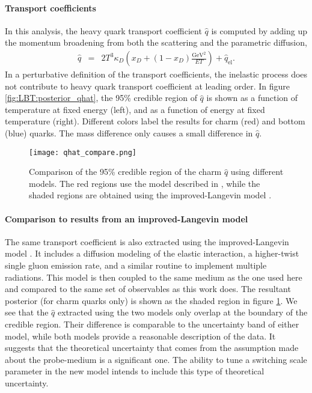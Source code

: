 \paragraph{Transport coefficients} In this analysis, the heavy quark transport coefficient $\hat{q}$ is computed by adding up the momentum broadening from both the scattering and the parametric diffusion,
\begin{eqnarray}\label{eq:qhat}
\hat{q} &=& 2T^3\kappa_D\left(x_D + (1-x_D)\frac{\textrm{GeV}^2}{ET}\right) + \hat{q}_{\textrm{el}}.
\end{eqnarray}
In a perturbative definition of the transport coefficients, the inelastic process does not contribute to heavy quark transport coefficient at leading order. 
In figure \ref{fig:LBT:posterior_qhat}, the 95\% credible region of $\hat{q}$ is shown as a function of temperature at fixed energy (left), and as a function of energy at fixed temperature (right).
Different colors label the results for charm (red) and bottom (blue) quarks.
The mass difference only causes a small difference in $\hat{q}$.

\begin{figure}
\singlespacing
\centering
\texttt{[image: qhat\_compare.png]}
\caption[Comparison of the 95\% credible region of the charm $\hat{q}$ using]{Comparison of the 95\% credible region of the charm $\hat{q}$ using different models. The red regions use the model described in \cite{Ke:2018tsh}, while the  shaded regions are obtained using  the improved-Langevin model \cite{Cao:2013ita}.}\label{fig:LBT:compare_qhat}
\end{figure}

\paragraph{Comparison to results from an improved-Langevin model}
The same transport coefficient is also extracted using the improved-Langevin model \cite{Cao:2013ita}.
It includes a diffusion modeling of the elastic interaction, a higher-twist single gluon emission rate, and a similar routine to implement multiple radiations.
This model is then coupled to the same medium as the one used here and compared to the same set of observables as this work does.
The resultant posterior (for charm quarks only) is shown as the shaded region in figure \ref{fig:LBT:compare_qhat}.
We see that the $\hat{q}$ extracted using the two models only overlap at the boundary of the credible region.
Their difference is comparable to the uncertainty band of either model, while both models provide a reasonable description of the data.
It suggests that the theoretical uncertainty that comes from the assumption made about the probe-medium is a significant one.
The ability to tune a switching scale parameter in the new model intends to include this type of theoretical uncertainty.

